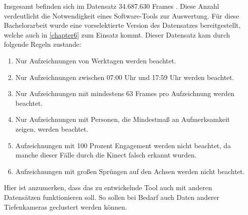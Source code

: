 Insgesamt befinden sich im Datensatz 34.687.630 Frames \citep{temiz_konzeption_2022}.
Diese Anzahl verdeutlicht die Notwendigkeit eines Software-Tools zur Auswertung.
Für diese Bachelorarbeit wurde eine vorselektierte Version des Datensatzes bereitgestellt,
welche auch in \autoref{chapter6} zum Einsatz kommt.
\clearpage
Dieser Datensatz kam durch folgende Regeln zustande:
\begin{enumerate}
  \item Nur Aufzeichnungen von Werktagen werden beachtet.
  \item Nur Aufzeichnungen zwischen 07:00 Uhr und 17:59 Uhr werden beachtet.
  \item Nur Aufzeichnungen mit mindestens 63 Frames pro Aufzeichnung werden beachtet.
  \item Nur Aufzeichnungen mit Personen, die Mindestmaß an Aufmerksamkeit zeigen, werden beachtet.
  \item Aufzeichnungen mit 100 Prozent Engagement werden nicht beachtet, da manche dieser Fälle durch die Kinect falsch erkannt wurden.
  \item Aufzeichnungen mit großen Sprüngen auf den Achsen werden nicht beachtet.
\end{enumerate}
Hier ist anzumerken, dass das zu entwickelnde Tool auch mit anderen Datensätzen funktionieren soll.
So sollen bei Bedarf auch Daten anderer Tiefenkameras geclustert werden können.
